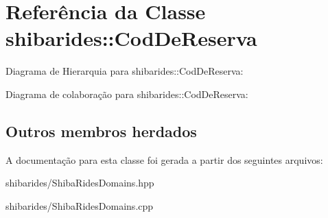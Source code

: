 \hypertarget{classshibarides_1_1CodDeReserva}{}\section{Referência da Classe shibarides\+:\+:Cod\+De\+Reserva}
\label{classshibarides_1_1CodDeReserva}


Diagrama de Hierarquia para shibarides\+:\+:Cod\+De\+Reserva\+:


Diagrama de colaboração para shibarides\+:\+:Cod\+De\+Reserva\+:
\subsection*{Outros membros herdados}


A documentação para esta classe foi gerada a partir dos seguintes arquivos\+:\begin{DoxyCompactItemize}
\item 
shibarides/Shiba\+Rides\+Domains.\+hpp\item 
shibarides/Shiba\+Rides\+Domains.\+cpp\end{DoxyCompactItemize}
